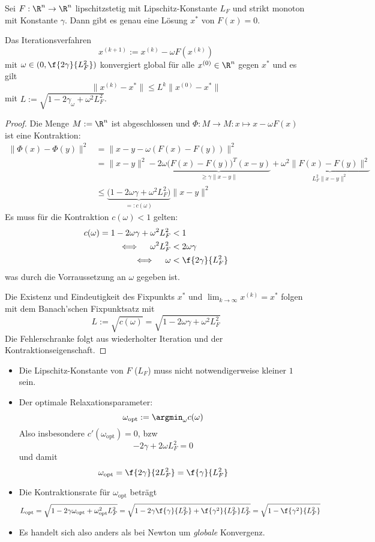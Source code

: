 \documentclass[11pt]{scrbook}
\begin{document}
\begin{st} \label{3.20}
	Sei $F: \R^n \to \R^n$ lipschitzstetig mit Lipschitz-Konstante $L_F$ und strikt monoton mit Konstante $\gamma$.
	Dann gibt es genau eine Lösung $x^*$ von $F(x) = 0$.
	
	Das Iterationsverfahren
	\[
		x^{(k+1)} := x^{(k)} - \omega F(x^{(k)})
	\]
	mit $\omega \in (0, \f {2\gamma}{L_F^2})$ konvergiert global für alle $x^{(0)} \in \R^n$ gegen $x^*$ und es gilt
	\[
		\|x^{(k)} - x^*\| \le L^k \|x^{(0)} - x^*\|
	\]
	mit $L := \sqrt{1- 2 \gamma_\omega + \omega^2 L_F^2}$.
	\begin{proof}
		Die Menge $M := \R^n$ ist abgeschlossen und $\Phi: M \to M : x \mapsto x - \omega F(x)$ ist eine Kontraktion:
		\begin{align*}
			\|\Phi(x) - \Phi(y) \|^2 
			&= \|x-y - \omega(F(x) - F(y)) \|^2 \\
			&= \|x-y\|^2 - 2 \omega \underbrace{\big(F(x)-F(y)\big)^T(x-y)}_{\ge \gamma \|x-y\|} + \omega^2 \underbrace{\|F(x)-F(y)\|^2}_{L_F^2 \|x-y\|^2} \\
			&\le \underbrace{\big(1-2\omega \gamma + \omega^2 L_F^2\big)}_{=:c(\omega)} \|x-y\|^2
		\end{align*}
		Es muss für die Kontraktion $c(\omega) < 1$ gelten:
		\begin{align*}
			c(\omega) = 1 - 2 \omega \gamma + \omega^2 L_F^2 &< 1 \\
			\iff \quad \omega^2 L_F^2 &< 2 \omega \gamma \\
			\iff \quad  \omega &< \f {2\gamma}{L_F^2}
		\end{align*}
		was durch die Vorraussetzung an $\omega$ gegeben ist.

		Die Existenz und Eindeutigkeit des Fixpunkts $x^*$ und $\lim_{k\to \infty}x^{(k)} = x^*$ folgen mit dem Banach'schen Fixpunktsatz mit
		\[
			L := \sqrt{c(\omega)} = \sqrt{1-2\omega \gamma + \omega^2 L_F^2}
		\]
		Die Fehlerschranke folgt aus wiederholter Iteration und der Kontraktionseigenschaft.
	\end{proof}
	\begin{note}
		\begin{itemize}
			\item
				Die Lipschitz-Konstante von $F$ ($L_F$) muss nicht notwendigerweise kleiner $1$ sein.
			\item
				Der optimale Relaxationsparameter:
				\[
					\omega_{\text{opt}} := \argmin_{\omega} c(\omega)
				\]
				Also insbesondere $c'(\omega_{\text{opt}}) = 0$, bzw
				\[
					- 2 \gamma + 2 \omega L_F^2 = 0
				\]
				und damit
				\[
					\omega_{\text{opt}} = \f {2 \gamma}{2L_F^2} = \f {\gamma}{L_F^2}
				\]
			\item
				Die Kontraktionsrate für $\omega_{\text{opt}}$ beträgt
				\[
					L_{\text{opt}} = \sqrt{1-2 \gamma \omega_{\text{opt}} + \omega_{\text{opt}}^2 L_F^2}
					= \sqrt{1-2 \gamma \f{\gamma}{L_F^2} + \f{\gamma^2}{L_F^2} L_F^2} 
					= \sqrt {1 - \f {\gamma^2}{L_F^2}}
				\]
			\item
				Es handelt sich also anders als bei Newton um \emph{globale} Konvergenz.


\end{itemize}
\end{note}
\end{st}
\end{document}
